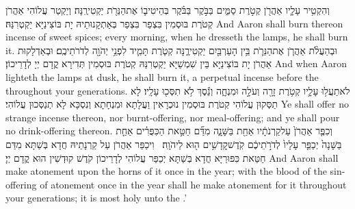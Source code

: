 {וְהִקְטִ֥יר עָלָ֛יו אַהֲרֹ֖ן קְטֹ֣רֶת סַמִּ֑ים בַּבֹּ֣קֶר בַּבֹּ֗קֶר בְּהֵיטִיב֛וֹ אֶת\maqqaf הַנֵּרֹ֖ת יַקְטִירֶֽנָּה׃}
{וְיַקְטַר עֲלוֹהִי אַהֲרֹן קְטֹרֶת בּוּסְמִין בִּצְפַר בִּצְפַר בְּאַתְקָנוּתֵיהּ יָת בּוֹצִינַיָּא יַקְטְרִנַּהּ׃}
{And Aaron shall burn thereon incense of sweet spices; every morning, when he dresseth the lamps, he shall burn it.}{}
{וּבְהַעֲלֹ֨ת אַהֲרֹ֧ן אֶת\maqqaf הַנֵּרֹ֛ת בֵּ֥ין הָעַרְבַּ֖יִם יַקְטִירֶ֑נָּה קְטֹ֧רֶת תָּמִ֛יד לִפְנֵ֥י יְהֹוָ֖ה לְדֹרֹתֵיכֶֽם׃}
{וּבְאַדְלָקוּת אַהֲרֹן יָת בּוֹצִינַיָּא בֵּין שִׁמְשַׁיָּא יַקְטְרִנַּהּ קְטֹרֶת בּוּסְמִין תְּדִירָא קֳדָם יְיָ לְדָרֵיכוֹן׃}
{And when Aaron lighteth the lamps at dusk, he shall burn it, a perpetual incense before the \lord\space throughout your generations.}{}
{לֹא\maqqaf תַעֲל֥וּ עָלָ֛יו קְטֹ֥רֶת זָרָ֖ה וְעֹלָ֣ה וּמִנְחָ֑ה וְנֵ֕סֶךְ לֹ֥א תִסְּכ֖וּ עָלָֽיו׃}
{לָא תַסְּקוּן עֲלוֹהִי קְטֹרֶת בּוּסְמִין נוּכְרָאִין וַעֲלָתָא וּמִנְחָתָא וְנִסְכָּא לָא תְנַסְּכוּן עֲלוֹהִי׃}
{Ye shall offer no strange incense thereon, nor burnt-offering, nor meal-offering; and ye shall pour no drink-offering thereon.}{}
{וְכִפֶּ֤ר אַהֲרֹן֙ עַל\maqqaf קַרְנֹתָ֔יו אַחַ֖ת בַּשָּׁנָ֑ה מִדַּ֞ם חַטַּ֣את הַכִּפֻּרִ֗ים אַחַ֤ת בַּשָּׁנָה֙ יְכַפֵּ֤ר עָלָיו֙ לְדֹרֹ֣תֵיכֶ֔ם קֹֽדֶשׁ\maqqaf קׇדָשִׁ֥ים ה֖וּא לַיהֹוָֽה׃ \petucha }
{וִיכַפַּר אַהֲרֹן עַל קַרְנָתֵיהּ חֲדָא בְּשַׁתָּא מִדַּם חַטַּאת כִּפּוּרַיָּא חֲדָא בְּשַׁתָּא יְכַפַּר עֲלוֹהִי לְדָרֵיכוֹן קֹדֶשׁ קוּדְשִׁין הוּא קֳדָם יְיָ׃}
{And Aaron shall make atonement upon the horns of it once in the year; with the blood of the sin-offering of atonement once in the year shall he make atonement for it throughout your generations; it is most holy unto the \lord.’}{}
